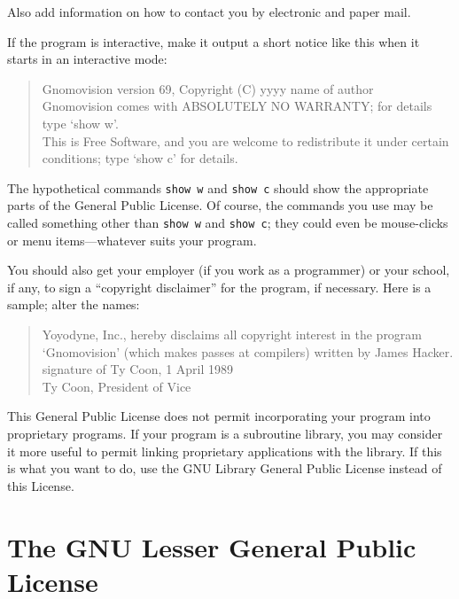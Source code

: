 \documentclass[11pt, letterpaper]{book}
\begin{document}
Also add information on how to contact you by electronic and paper mail.

If the program is interactive, make it output a short notice like this
when it starts in an interactive mode:

\begin{quote}
Gnomovision version 69, Copyright (C) yyyy  name of author \\
Gnomovision comes with ABSOLUTELY NO WARRANTY; for details type `show w'. \\
This is Free Software, and you are welcome to redistribute it
under certain conditions; type `show c' for details.
\end{quote}


The hypothetical commands {\tt show w} and {\tt show c} should show the
appropriate parts of the General Public License. Of course, the commands
you use may be called something other than {\tt show w} and {\tt show c};
they could even be mouse-clicks or menu items---whatever suits your
program.

You should also get your employer (if you work as a programmer) or your
school, if any, to sign a ``copyright disclaimer'' for the program, if
necessary. Here is a sample; alter the names:

\begin{quote}
Yoyodyne, Inc., hereby disclaims all copyright interest in the program \\
`Gnomovision' (which makes passes at compilers) written by James Hacker. \\

signature of Ty Coon, 1 April 1989 \\
Ty Coon, President of Vice
\end{quote}


This General Public License does not permit incorporating your program
into proprietary programs. If your program is a subroutine library, you
may consider it more useful to permit linking proprietary applications
with the library. If this is what you want to do, use the GNU Library
General Public License instead of this License.


\chapter{The GNU Lesser General Public License}
\end{document}
